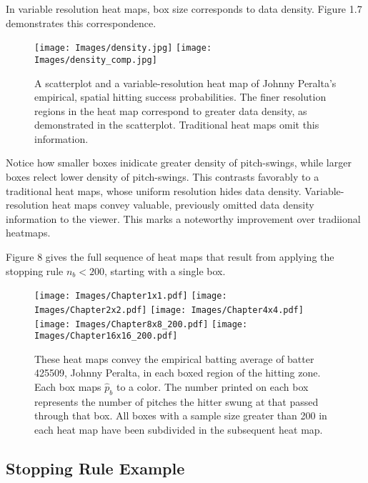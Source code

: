 In variable resolution heat maps, box size corresponds to data density. Figure 1.7 demonstrates this correspondence. 
        \begin{figure}[H]
      	\centering
      	\texttt{[image: Images/density.jpg]}
      	\texttt{[image: Images/density\_comp.jpg]} 
      	\caption{A scatterplot and a variable-resolution heat map of Johnny Peralta's empirical, spatial hitting success probabilities. The finer resolution regions in the heat map correspond to greater data density, as demonstrated in the scatterplot. Traditional heat maps omit this information.}
      	\end{figure}
Notice how smaller boxes inidicate greater density of pitch-swings, while larger boxes relect lower density of pitch-swings. This contrasts favorably to a traditional heat maps, whose uniform resolution hides data density. Variable-resolution heat maps convey valuable, previously omitted data density information to the viewer. This marks a noteworthy improvement over tradiional heatmaps.

Figure 8 gives the full sequence of heat maps that result from applying the stopping rule $n_{b} < 200$, starting with a single box.
        \begin{figure}[H]
      	\centering
      	\texttt{[image: Images/Chapter1x1.pdf]}
      	\texttt{[image: Images/Chapter2x2.pdf]}
      	\texttt{[image: Images/Chapter4x4.pdf]}
      	\texttt{[image: Images/Chapter8x8\_200.pdf]} 
      	\texttt{[image: Images/Chapter16x16\_200.pdf]} 
      	\caption{These heat maps convey the empirical batting average of batter 425509, Johnny Peralta, in each boxed region of the hitting zone. Each box maps $\hat{p}_{b}$ to a color. The number printed on each box represents the number of pitches the hitter swung at that passed through that box. All boxes with a sample size greater than 200 in each heat map have been subdivided in the subsequent heat map.}
      	\end{figure}
      	
\subsection{Stopping Rule Example} %
      	
